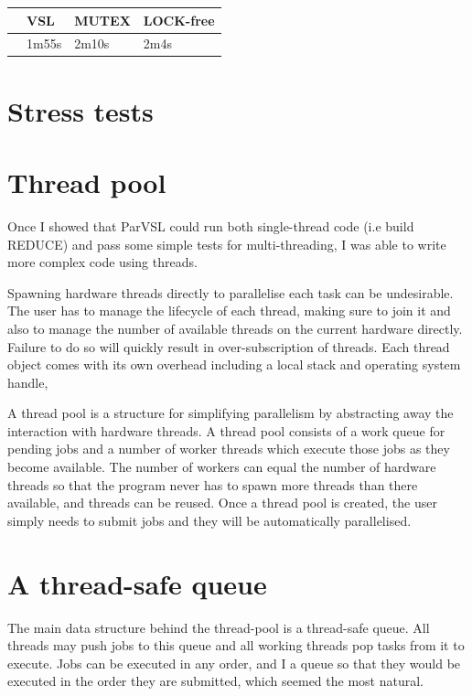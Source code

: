 \begin{center}
\begin{tabular}{llll}
 & VSL & MUTEX & LOCK-free\\
\hline
 & 1m55s & 2m10s & 2m4s\\
\end{tabular}
\end{center}

\section{Stress tests}
\section{Thread pool}

Once I showed  that ParVSL could run both single-thread code (i.e build REDUCE) and pass some
simple tests for multi-threading, I was able to write more complex code using threads.

Spawning hardware threads directly to parallelise each task can be undesirable. The user has
to manage the lifecycle of each thread, making sure to join it and also to manage the number
of available threads on the current hardware directly. Failure to do so will quickly result in
over-subscription of threads. Each thread object comes with its own overhead including a local
stack and operating system handle,

A thread pool is a structure for simplifying parallelism by abstracting away the interaction
with hardware threads. A thread pool consists of a work queue for pending jobs and a number
of worker threads which execute those jobs as they become available. The number of workers
can equal the number of hardware threads so that the program never has to spawn more threads
than there available, and threads can be reused. Once a thread pool is created, the user simply
needs to submit jobs and they will be automatically parallelised.

\section{A thread-safe queue}

The main data structure behind the thread-pool is a thread-safe queue. All threads may push
jobs to this queue and all working threads pop tasks from it to execute. Jobs can be executed
in any order, and I a queue so that they would be executed in the order they are submitted, which
seemed the most natural.

